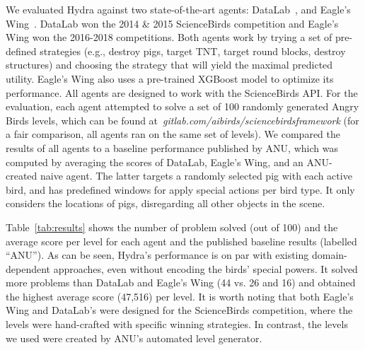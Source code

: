 \documentclass[letterpaper]{article} %
\begin{document}
We evaluated Hydra against two state-of-the-art agents:
DataLab~\cite{borovicka2014datalab}, and
Eagle's Wing~\cite{wang2017description}.
DataLab won the 2014 \& 2015 ScienceBirds competition and Eagle's Wing won the 2016-2018 competitions.
Both agents work by trying a set of pre-defined strategies (e.g., destroy pigs, target TNT, target round blocks, destroy structures) and choosing the strategy that will yield the maximal predicted utility.
Eagle's Wing also uses a pre-trained XGBoost model to optimize its performance. %
All agents are designed to work with the ScienceBirds API. For the evaluation, each agent attempted to solve a set of 100 randomly generated Angry Birds levels, which can be found at~\emph{gitlab.com/aibirds/sciencebirdsframework} (for a fair comparison, all agents ran on the same set of levels).
We compared the results of all agents to a baseline performance published by ANU, which was computed by averaging the scores of
DataLab,
Eagle's Wing,
and an ANU-created naive agent.
The latter targets a randomly selected pig with each active bird, and has predefined windows for apply special actions per bird type. It only considers the locations of pigs, disregarding all other objects in the scene.




Table~\ref{tab:results} shows the number of problem solved (out of 100) and the average score per level for each agent and the published baseline results (labelled ``ANU'').
As can be seen, Hydra's performance is on par with existing domain-dependent approaches, even without encoding the birds' special powers. It solved more problems than DataLab and Eagle's Wing (44 vs. 26 and 16) and obtained the highest average score (47,516) per level.
It is worth noting that both Eagle's Wing and DataLab's were designed for the ScienceBirds competition, where the levels were hand-crafted with specific winning strategies. In contrast, the levels we used were created by ANU's automated level generator.
\end{document}
